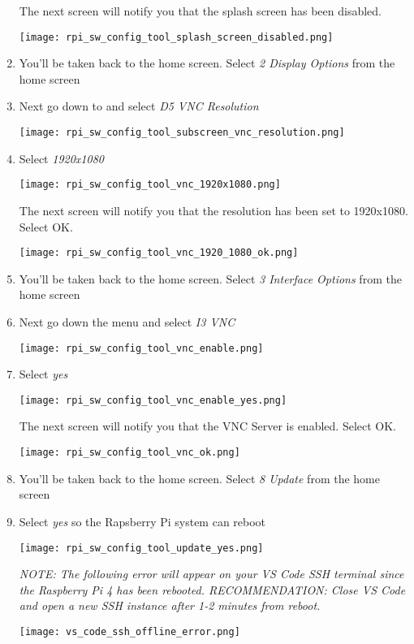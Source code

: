 \documentclass[journal]{IEEEtran}
\begin{document}
\begin{enumerate}
        The next screen will notify you that the splash screen has been disabled. \newline

        \texttt{[image: rpi\_sw\_config\_tool\_splash\_screen\_disabled.png]}

        \item You'll be taken back to the home screen. Select \emph{2 Display Options} from the home screen
        
        \item Next go down to and select \emph{D5 VNC Resolution}
        
        \texttt{[image: rpi\_sw\_config\_tool\_subscreen\_vnc\_resolution.png]}
        
        \item Select \emph{1920x1080}
        
        \texttt{[image: rpi\_sw\_config\_tool\_vnc\_1920x1080.png]}

        The next screen will notify you that the resolution has been set to 1920x1080. Select OK.

        \texttt{[image: rpi\_sw\_config\_tool\_vnc\_1920\_1080\_ok.png]}
        
        \item You'll be taken back to the home screen. Select \emph{3 Interface Options} from the home screen

        \item Next go down the menu and select \emph{I3 VNC}
        
        \texttt{[image: rpi\_sw\_config\_tool\_vnc\_enable.png]}

        \item Select \emph{yes}
        
        \texttt{[image: rpi\_sw\_config\_tool\_vnc\_enable\_yes.png]}

        The next screen will notify you that the VNC Server is enabled. Select OK.

        \texttt{[image: rpi\_sw\_config\_tool\_vnc\_ok.png]}

        \item You'll be taken back to the home screen. Select \emph{8 Update} from the home screen

        \item Select \emph{yes} so the Rapsberry Pi system can reboot
        
        \texttt{[image: rpi\_sw\_config\_tool\_update\_yes.png]}

        \emph{NOTE: The following error will appear on your VS Code SSH terminal since the Raspberry Pi 4 has been rebooted. \newline RECOMMENDATION: Close VS Code and open a new SSH instance after 1-2 minutes from reboot.} \newline

        \texttt{[image: vs\_code\_ssh\_offline\_error.png]}

    \end{enumerate}
\end{document}
